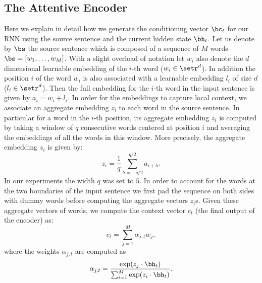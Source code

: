 \subsection{The Attentive Encoder}
\label{sup-material:encoder}
Here we explain in detail how we generate the conditioning vector $\bc_t$ 
for our RNN using the source sentence and the current hidden state $\bh_t$. 
Let us denote by $\bs$ the source sentence which is composed of a sequence 
of $M$ words $\bs = [w_1, \ldots, w_M]$. 
With a slight overload of notation let $w_i$ also denote the $d$ dimensional 
learnable embedding of the $i$-th word ($w_i \in \setr^d$). In addition the 
position $i$ of the word $w_i$ is also associated with a learnable embedding $l_i$ 
of size $d$ ($l_i \in \setr^d$). Then the full embedding for 
the $i$-th word in the input sentence is given by $a_i = w_i + l_i$. 
In order for the embeddings to capture local context, we associate an 
aggregate embedding $z_i$ to each word in the source sentence. 
In particular for a word in the $i$-th position, its aggregate embedding 
$z_i$ is computed by taking a window of $q$ consecutive words centered 
at position $i$ and averaging the embeddings of all the words in this window. More precisely, the aggregate embedding $z_i$ is given by: 
\begin{equation}
z_i = \frac{1}{q} \sum_{h = -q/2}^{q/2} a_{i + h}. 
\end{equation}
In our experiments the width $q$ was set to $5$. 
In order to account for the words at the two boundaries of the input 
sentence we first pad the sequence on both sides with dummy words before 
computing the aggregate vectors $z_i$s. Given these aggregate vectors of words, we compute 
the context vector $c_t$ (the final output of the encoder) as: 
\begin{equation}
c_t = \sum_{j=1}^M \alpha_{j,t} w_j, 
\end{equation}
where the weights $\alpha_{j, t}$ are computed as 
\begin{equation}
\alpha_{j, t} = \frac{\exp(z_j \cdot \bh_{t})}{\sum_{i=1}^M \exp(z_i \cdot \bh_{t})}.
\end{equation}




